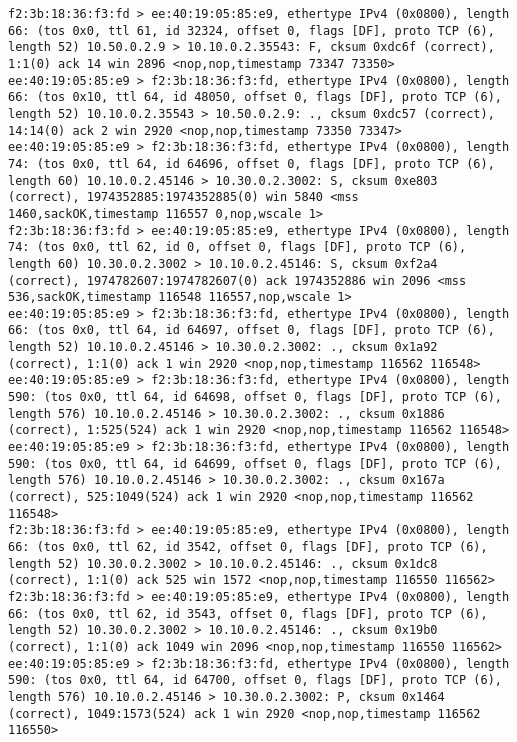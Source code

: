 \documentclass[a4paper,12pt]{article}
\begin{document}
\begin{Verbatim}
f2:3b:18:36:f3:fd > ee:40:19:05:85:e9, ethertype IPv4 (0x0800), length 66: (tos 0x0, ttl 61, id 32324, offset 0, flags [DF], proto TCP (6), length 52) 10.50.0.2.9 > 10.10.0.2.35543: F, cksum 0xdc6f (correct), 1:1(0) ack 14 win 2896 <nop,nop,timestamp 73347 73350>
ee:40:19:05:85:e9 > f2:3b:18:36:f3:fd, ethertype IPv4 (0x0800), length 66: (tos 0x10, ttl 64, id 48050, offset 0, flags [DF], proto TCP (6), length 52) 10.10.0.2.35543 > 10.50.0.2.9: ., cksum 0xdc57 (correct), 14:14(0) ack 2 win 2920 <nop,nop,timestamp 73350 73347>
ee:40:19:05:85:e9 > f2:3b:18:36:f3:fd, ethertype IPv4 (0x0800), length 74: (tos 0x0, ttl 64, id 64696, offset 0, flags [DF], proto TCP (6), length 60) 10.10.0.2.45146 > 10.30.0.2.3002: S, cksum 0xe803 (correct), 1974352885:1974352885(0) win 5840 <mss 1460,sackOK,timestamp 116557 0,nop,wscale 1>
f2:3b:18:36:f3:fd > ee:40:19:05:85:e9, ethertype IPv4 (0x0800), length 74: (tos 0x0, ttl 62, id 0, offset 0, flags [DF], proto TCP (6), length 60) 10.30.0.2.3002 > 10.10.0.2.45146: S, cksum 0xf2a4 (correct), 1974782607:1974782607(0) ack 1974352886 win 2096 <mss 536,sackOK,timestamp 116548 116557,nop,wscale 1>
ee:40:19:05:85:e9 > f2:3b:18:36:f3:fd, ethertype IPv4 (0x0800), length 66: (tos 0x0, ttl 64, id 64697, offset 0, flags [DF], proto TCP (6), length 52) 10.10.0.2.45146 > 10.30.0.2.3002: ., cksum 0x1a92 (correct), 1:1(0) ack 1 win 2920 <nop,nop,timestamp 116562 116548>
ee:40:19:05:85:e9 > f2:3b:18:36:f3:fd, ethertype IPv4 (0x0800), length 590: (tos 0x0, ttl 64, id 64698, offset 0, flags [DF], proto TCP (6), length 576) 10.10.0.2.45146 > 10.30.0.2.3002: ., cksum 0x1886 (correct), 1:525(524) ack 1 win 2920 <nop,nop,timestamp 116562 116548>
ee:40:19:05:85:e9 > f2:3b:18:36:f3:fd, ethertype IPv4 (0x0800), length 590: (tos 0x0, ttl 64, id 64699, offset 0, flags [DF], proto TCP (6), length 576) 10.10.0.2.45146 > 10.30.0.2.3002: ., cksum 0x167a (correct), 525:1049(524) ack 1 win 2920 <nop,nop,timestamp 116562 116548>
f2:3b:18:36:f3:fd > ee:40:19:05:85:e9, ethertype IPv4 (0x0800), length 66: (tos 0x0, ttl 62, id 3542, offset 0, flags [DF], proto TCP (6), length 52) 10.30.0.2.3002 > 10.10.0.2.45146: ., cksum 0x1dc8 (correct), 1:1(0) ack 525 win 1572 <nop,nop,timestamp 116550 116562>
f2:3b:18:36:f3:fd > ee:40:19:05:85:e9, ethertype IPv4 (0x0800), length 66: (tos 0x0, ttl 62, id 3543, offset 0, flags [DF], proto TCP (6), length 52) 10.30.0.2.3002 > 10.10.0.2.45146: ., cksum 0x19b0 (correct), 1:1(0) ack 1049 win 2096 <nop,nop,timestamp 116550 116562>
ee:40:19:05:85:e9 > f2:3b:18:36:f3:fd, ethertype IPv4 (0x0800), length 590: (tos 0x0, ttl 64, id 64700, offset 0, flags [DF], proto TCP (6), length 576) 10.10.0.2.45146 > 10.30.0.2.3002: P, cksum 0x1464 (correct), 1049:1573(524) ack 1 win 2920 <nop,nop,timestamp 116562 116550>

\end{Verbatim}
\end{document}
